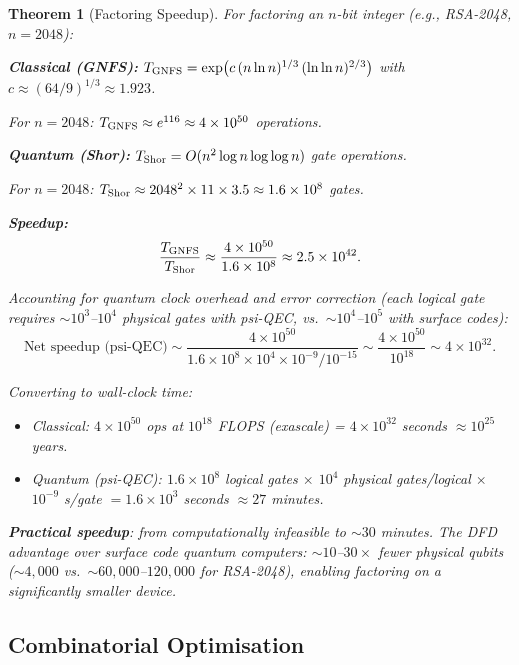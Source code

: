 \documentclass[11pt]{article}
\newtheorem{theorem}{Theorem}[section]
\theoremstyle{definition}
\theoremstyle{remark}
\newcommand{\ee}[1]{\times 10^{#1}}
\begin{document}
\begin{theorem}[Factoring Speedup]
\label{thm:factoring-speedup}
For factoring an $n$-bit integer (e.g., RSA-2048, $n = 2048$):

\textbf{Classical (GNFS):}
$T_{\rm GNFS} = \exp\!\left(c\,(n \ln n)^{1/3}\,(\ln\ln n)^{2/3}
\right)$ with $c \approx (64/9)^{1/3} \approx 1.923$.

For $n = 2048$: $T_{\rm GNFS} \approx e^{116} \approx 4\ee{50}$
operations.

\textbf{Quantum (Shor):}
$T_{\rm Shor} = O(n^2 \log n \log\log n)$ gate operations.

For $n = 2048$: $T_{\rm Shor} \approx 2048^2 \times 11 \times 3.5
\approx 1.6\ee{8}$ gates.

\textbf{Speedup:}
\begin{equation}
  \frac{T_{\rm GNFS}}{T_{\rm Shor}} \approx
  \frac{4\ee{50}}{1.6\ee{8}} \approx 2.5\ee{42}.
  \label{eq:factor-speedup-raw}
\end{equation}

Accounting for quantum clock overhead and error correction
(each logical gate requires $\sim 10^3$--$10^4$ physical gates with
psi-QEC, vs.\ $\sim 10^4$--$10^5$ with surface codes):
\begin{equation}
  \text{Net speedup (psi-QEC)} \sim
  \frac{4\ee{50}}{1.6\ee{8} \times 10^4 \times 10^{-9}/10^{-15}}
  \sim \frac{4\ee{50}}{10^{18}} \sim 4\ee{32}.
  \label{eq:factor-speedup-net}
\end{equation}

Converting to wall-clock time:
\begin{itemize}[nosep]
  \item Classical: $4\ee{50}$ ops at $10^{18}$ FLOPS (exascale) =
    $4\ee{32}$ seconds $\approx 10^{25}$ years.
  \item Quantum (psi-QEC): $1.6\ee{8}$ logical gates $\times$
    $10^4$ physical gates/logical $\times$ $10^{-9}$ s/gate
    $= 1.6\ee{3}$ seconds $\approx 27$ minutes.
\end{itemize}

\textbf{Practical speedup}: from computationally infeasible to
$\sim 30$ minutes. The DFD advantage over surface code quantum
computers: $\sim 10$--$30\times$ fewer physical qubits
($\sim 4{,}000$ vs.\ $\sim 60{,}000$--$120{,}000$ for RSA-2048),
enabling factoring on a significantly smaller device.
\end{theorem}

\subsection{Combinatorial Optimisation}
\label{sec:optim-speedup}
\end{document}
